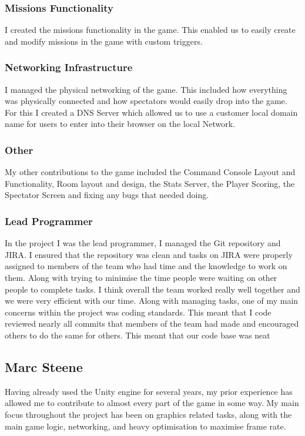 \documentclass[a4paper,11pt]{article}
\begin{document}
\subsubsection{Missions Functionality}
I created the missions functionality in the game. This enabled us to easily create and modify missions in the game with custom triggers. 

\subsubsection{Networking Infrastructure}
I managed the physical networking of the game. This included how everything was physically connected and how spectators would easily drop into the game. For this I created a DNS Server which allowed us to use a customer local domain name for users to enter into their browser on the local Network. 
 
\subsubsection{Other}
My other contributions to the game included the Command Console Layout and Functionality, Room layout and design, the Stats Server, the Player Scoring, the Spectator Screen and fixing any bugs that needed doing. 


\subsubsection{Lead Programmer}
In the project I was the lead programmer, I managed the Git repository and JIRA. I ensured that the repository was clean and tasks on JIRA were properly assigned to members of the team who had time and the knowledge to work on them. Along with trying to minimise the time people were waiting on other people to complete tasks. I think overall the team worked really well together and we were very efficient with our time.
Along with managing tasks, one of my main concerns within the project was coding standards. This meant that I code reviewed nearly all commits that members of the team had made and encouraged others to do the same for others. This meant that our code base was neat 


\clearpage

\subsection{Marc Steene}
Having already used the Unity engine for several years, my prior experience has allowed me to contribute to almost every part of the game in some way. My main focus throughout the project has been on graphics related tasks, along with the main game logic, networking, and heavy optimisation to maximise frame rate.
\end{document}

